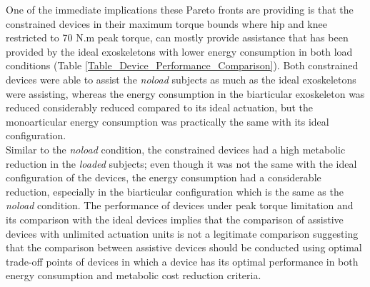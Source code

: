 \documentclass[10pt,letterpaper]{article}
\begin{document}
One of the immediate implications these Pareto fronts are providing is that the constrained devices in their maximum torque bounds where hip and knee restricted to 70 N.m peak torque, can mostly provide assistance that has been provided by the ideal exoskeletons with lower energy consumption in both load conditions (Table \ref{Table_Device_Performance_Comparison}).  Both constrained devices were able to assist the \textit{noload} subjects as much as the ideal exoskeletons were assisting, whereas the energy consumption in the biarticular exoskeleton was reduced considerably reduced compared to its ideal actuation, but the monoarticular energy consumption was practically the same with its ideal configuration.\\
Similar to the \textit{noload} condition, the constrained devices had a high metabolic reduction in the \textit{loaded} subjects; even though it was not the same with the ideal configuration of the devices, the energy consumption had a considerable reduction, especially in the biarticular configuration which is the same as the \textit{noload} condition.
The performance of devices under peak torque limitation and its comparison with the ideal devices implies that the comparison of assistive devices with unlimited actuation units is not a legitimate comparison suggesting that the comparison between assistive devices should be conducted using optimal trade-off points of devices in which a device has its optimal performance in both energy consumption and metabolic cost reduction criteria.\\
\end{document}
